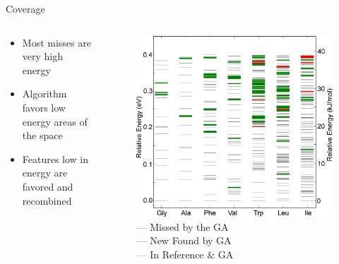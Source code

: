 \documentclass[10pt]{beamer}
\begin{document}
{%
\begin{frame}{Coverage}
	\begin{columns}[c] %
		\begin{column}{.4\textwidth}
			\begin{itemize}[<+->]
				\item {Most misses are very high energy}
				\item {Algorithm favors low energy areas of the space}
				\item {Features low in energy are favored and recombined}
			\end{itemize}
		\end{column}
		\hfill
		\begin{column}{0.6\textwidth}
			\begin{figure}
				\includegraphics[width=0.75\linewidth]{images/Supady5.jpeg}
				\caption*{\textcolor{red}{---} Missed by the GA \\
				  \textcolor{darkgreen}{---} New Found by GA \\
				  \textcolor{gray}{---} In Reference \& GA}
			\end{figure}
		\end{column}
	\end{columns}
\end{frame}
}
\end{document}
